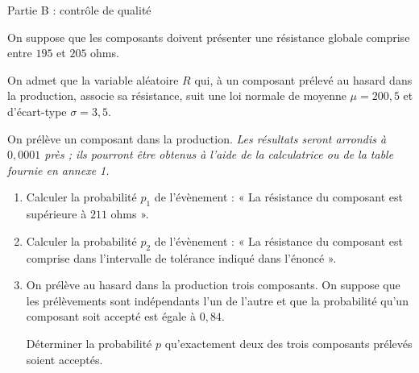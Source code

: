 \begin{h3}Partie B : contrôle de qualité\end{h3}
On suppose que les composants doivent présenter une résistance globale comprise entre $195$ et $205$ ohms.
\par
On admet que la variable aléatoire $R$ qui, à un composant prélevé au hasard dans la production, associe sa résistance, suit une loi normale de moyenne $\mu =200,5$ et d'écart-type $\sigma =3,5$.
\par
On prélève un composant dans la production.
\textit{Les résultats seront arrondis à $0,0001$ près ; ils pourront être obtenus à l'aide de la calculatrice ou de la table fournie en annexe 1. }
\begin{enumerate}
     \item
     Calculer la probabilité $p_{1}$ de l'évènement : « La résistance du composant est supérieure à $211$ ohms ».
     \item
     Calculer la probabilité $p_{2}$ de l'évènement : « La résistance du composant est comprise dans l'intervalle de tolérance indiqué dans l'énoncé ».
     \item
     On prélève au hasard dans la production trois composants. On suppose que les prélèvements sont indépendants l'un de l'autre et que la probabilité qu'un composant soit accepté est égale à $0,84$.
     \par
Déterminer la probabilité $p$ qu'exactement deux des trois composants prélevés soient acceptés.\end{enumerate}
